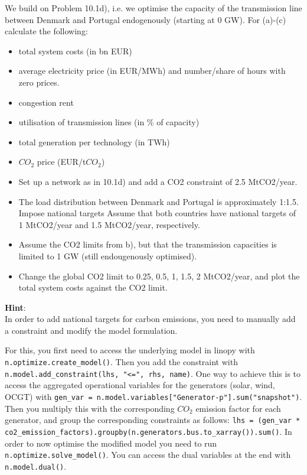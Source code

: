 \documentclass[10pt]{article}
\newenvironment{problem}[2][Problem]{\begin{trivlist}
\item[\hskip \labelsep {\bfseries #1}\hskip \labelsep {\bfseries #2.}]}{\end{trivlist}}
\begin{document}
\begin{problem}{10.2}
We build on Problem 10.1d), i.e. we optimise the capacity of the transmission line between Denmark and Portugal endogenously (starting at 0 GW). For (a)-(c) calculate the following:
\begin{itemize}
	\item total system costs (in bn EUR)
	\item average electricity price (in EUR/MWh) and number/share of hours with zero prices.
	\item congestion rent 
	\item utilisation of transmission lines (in \% of capacity)
	\item total generation per technology (in TWh)
	\item $CO_2$ price (EUR/t$CO_2$)
\end{itemize}




\begin{itemize}
	\item[a)] Set up a network as in 10.1d) and add a CO2 constraint of 2.5 MtCO2/year.
	\item[b)] The load distribution between Denmark and Portugal is approximately 1:1.5. Impose national targets  Assume that both countries have national targets of 1 MtCO2/year and 1.5 MtCO2/year, respectively.
	\item[c)] Assume the CO2 limits from b), but that the transmission capacities is limited to 1 GW (still endougenously optimised).
	\item[d)] Change the global CO2 limit to 0.25, 0.5, 1, 1.5, 2 MtCO2/year, and plot the total system costs against the CO2 limit.
	
\end{itemize}

\textbf{Hint}: \\
In order to add national targets for carbon emissions, you need to manually add a constraint and modify the model formulation. 

For this, you first need to access the underlying model in linopy with \texttt{n.optimize.create\_model()}. 
Then you add the constraint with \texttt{n.model.add\_constraint(lhs, "<=", rhs, name)}. One way to achieve this is to access the aggregated operational variables for the generators (solar, wind, OCGT) with \texttt{gen\_var = n.model.variables["Generator-p"].sum("snapshot")}. Then you multiply this with the corresponding $CO_2$ emission factor for each generator, and group the corresponding constraints as follows: \texttt{lhs = (gen\_var * co2\_emission\_factors).groupby(n.generators.bus.to\_xarray()).sum()}. In order to now optimise the modified model you need to run \texttt{n.optimize.solve\_model()}. You can access the dual variables at the end with \texttt{n.model.dual()}.



\end{problem}

\




\end{document}
